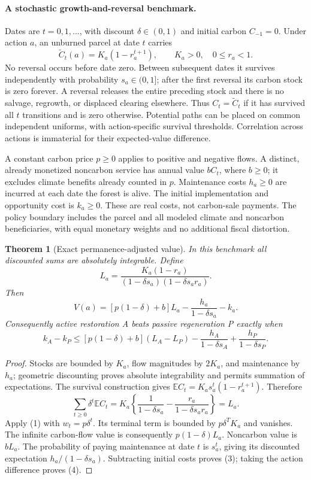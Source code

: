 \documentclass[11pt]{article}
\newtheorem{theorem}{Theorem}
\theoremstyle{definition}
\begin{document}
\paragraph{A stochastic growth-and-reversal benchmark.}
Dates are $t=0,1,\ldots$, with discount $\delta\in(0,1)$ and initial carbon $C_{-1}=0$. Under action $a$, an unburned parcel at date $t$ carries
\[
 \widetilde C_t(a)=K_a(1-r_a^{t+1}),
 \qquad K_a>0,\quad 0\leq r_a<1.
\]
No reversal occurs before date zero. Between subsequent dates it survives independently with probability $s_a\in(0,1]$; after the first reversal its carbon stock is zero forever. A reversal releases the entire preceding stock and there is no salvage, regrowth, or displaced clearing elsewhere. Thus $C_t=\widetilde C_t$ if it has survived all $t$ transitions and is zero otherwise. Potential paths can be placed on common independent uniforms, with action-specific survival thresholds. Correlation across actions is immaterial for their expected-value difference.

A constant carbon price $p\geq0$ applies to positive and negative flows. A distinct, already monetized noncarbon service has annual value $b C_t$, where $b\geq0$; it excludes climate benefits already counted in $p$. Maintenance costs $h_a\geq0$ are incurred at each date the forest is alive. The initial implementation and opportunity cost is $k_a\geq0$. These are real costs, not carbon-sale payments. The policy boundary includes the parcel and all modeled climate and noncarbon beneficiaries, with equal monetary weights and no additional fiscal distortion.

\begin{theorem}[Exact permanence-adjusted value]
In this benchmark all discounted sums are absolutely integrable. Define
\[
 L_a=\frac{K_a(1-r_a)}{(1-\delta s_a)(1-\delta s_a r_a)}.
 \tag{2}
\]
Then
\[
 V(a)=[p(1-\delta)+b]L_a-
        \frac{h_a}{1-\delta s_a}-k_a.
 \tag{3}
\]
Consequently active restoration A beats passive regeneration P exactly when
\[
 k_A-k_P\leq[p(1-\delta)+b](L_A-L_P)
       -\frac{h_A}{1-\delta s_A}+\frac{h_P}{1-\delta s_P}.
 \tag{4}
\]
\end{theorem}
\begin{proof}
Stocks are bounded by $K_a$, flow magnitudes by $2K_a$, and maintenance by $h_a$; geometric discounting proves absolute integrability and permits summation of expectations. The survival construction gives
$\mathbb E C_t=K_a s_a^t(1-r_a^{t+1})$. Therefore
\[
 \sum_{t\geq0}\delta^t\mathbb E C_t
 =K_a\left\{\frac{1}{1-\delta s_a}
       -\frac{r_a}{1-\delta s_a r_a}\right\}=L_a.
\]
Apply (1) with $w_t=p\delta^t$. Its terminal term is bounded by $p\delta^TK_a$ and vanishes. The infinite carbon-flow value is consequently $p(1-\delta)L_a$. Noncarbon value is $bL_a$. The probability of paying maintenance at date $t$ is $s_a^t$, giving its discounted expectation $h_a/(1-\delta s_a)$. Subtracting initial costs proves (3); taking the action difference proves (4).
\end{proof}
\end{document}
